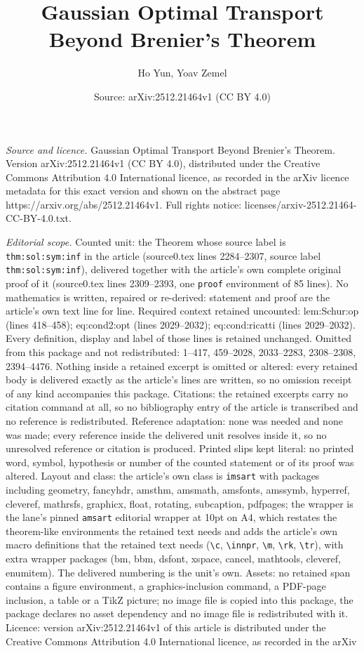 \documentclass[10pt,a4paper]{amsart}
\title[Gaussian Optimal Transport Beyond Brenier's Theorem]{Gaussian Optimal Transport Beyond Brenier's Theorem}
\author{Ho Yun, Yoav Zemel}
\date{Source: arXiv:2512.21464v1 (CC BY 4.0)}
\begin{document}
\maketitle

\noindent\emph{Source and licence.} Gaussian Optimal Transport Beyond Brenier's Theorem. Version arXiv:2512.21464v1 (CC BY 4.0), distributed under the Creative Commons Attribution 4.0 International licence, as recorded in the arXiv licence metadata for this exact version and shown on the abstract page https://arxiv.org/abs/2512.21464v1. Full rights notice: licenses/arxiv-2512.21464-CC-BY-4.0.txt.\par\smallskip

\noindent\textit{Editorial scope.} Counted unit: the Theorem whose source label is \texttt{thm:sol:sym:inf} in the article (source0.tex lines 2284--2307, source label \texttt{thm:sol:sym:inf}), delivered together with the article's own complete original proof of it (source0.tex lines 2309--2393, one \texttt{proof} environment of 85 lines). No mathematics is written, repaired or re-derived: statement and proof are the article's own text line for line. Required context retained uncounted: lem:Schur:op (lines 418--458); eq:cond2:opt (lines 2029--2032); eq:cond:ricatti (lines 2029--2032). Every definition, display and label of those lines is retained unchanged. Omitted from this package and not redistributed: 1--417, 459--2028, 2033--2283, 2308--2308, 2394--4476. Nothing inside a retained excerpt is omitted or altered: every retained body is delivered exactly as the article's lines are written, so no omission receipt of any kind accompanies this package. Citations: the retained excerpts carry no citation command at all, so no bibliography entry of the article is transcribed and no reference is redistributed. Reference adaptation: none was needed and none was made; every reference inside the delivered unit resolves inside it, so no unresolved reference or citation is produced. Printed slips kept literal: no printed word, symbol, hypothesis or number of the counted statement or of its proof was altered. Layout and class: the article's own class is \texttt{imsart} with packages including geometry, fancyhdr, amsthm, amsmath, amsfonts, amssymb, hyperref, cleveref, mathrsfs, graphicx, float, rotating, subcaption, pdfpages; the wrapper is the lane's pinned \texttt{amsart} editorial wrapper at 10pt on A4, which restates the theorem-like environments the retained text needs and adds the article's own macro definitions that the retained text needs (\texttt{\textbackslash c}, \texttt{\textbackslash innpr}, \texttt{\textbackslash m}, \texttt{\textbackslash rk}, \texttt{\textbackslash tr}), with extra wrapper packages (bm, bbm, dsfont, xspace, cancel, mathtools, cleveref, enumitem). The delivered numbering is the unit's own. Assets: no retained span contains a figure environment, a graphics-inclusion command, a PDF-page inclusion, a table or a TikZ picture; no image file is copied into this package, the package declares no asset dependency and no image file is redistributed with it. Licence: version arXiv:2512.21464v1 of this article is distributed under the Creative Commons Attribution 4.0 International licence, as recorded in the arXiv 
\end{document}
